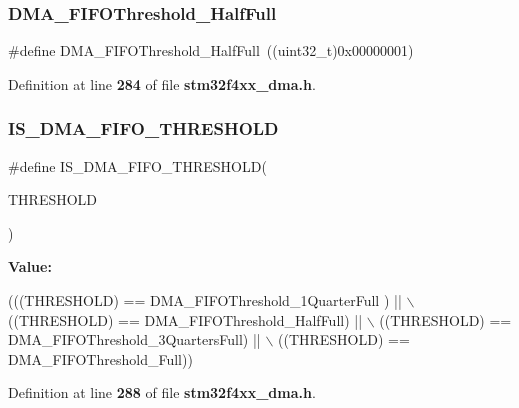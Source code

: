 \subsubsection{D\+M\+A\+\_\+\+F\+I\+F\+O\+Threshold\+\_\+\+Half\+Full}
{\footnotesize\ttfamily \#define D\+M\+A\+\_\+\+F\+I\+F\+O\+Threshold\+\_\+\+Half\+Full~((uint32\+\_\+t)0x00000001)}



Definition at line \textbf{ 284} of file \textbf{ stm32f4xx\+\_\+dma.\+h}.

\mbox{\label{group__DMA__fifo__threshold__level_gaeafc0d9e327d6e5b26cd37f6744b232f}} 
\subsubsection{I\+S\+\_\+\+D\+M\+A\+\_\+\+F\+I\+F\+O\+\_\+\+T\+H\+R\+E\+S\+H\+O\+LD}
{\footnotesize\ttfamily \#define I\+S\+\_\+\+D\+M\+A\+\_\+\+F\+I\+F\+O\+\_\+\+T\+H\+R\+E\+S\+H\+O\+LD(\begin{DoxyParamCaption}\item[{}]{T\+H\+R\+E\+S\+H\+O\+LD }\end{DoxyParamCaption})}

{\bfseries Value\+:}
\begin{DoxyCode}
(((THRESHOLD) == DMA_FIFOThreshold_1QuarterFull ) || \(\backslash\)
                                          ((THRESHOLD) == 
      DMA_FIFOThreshold_HalfFull)      || \(\backslash\)
                                          ((THRESHOLD) == 
      DMA_FIFOThreshold_3QuartersFull) || \(\backslash\)
                                          ((THRESHOLD) == DMA_FIFOThreshold_Full))
\end{DoxyCode}


Definition at line \textbf{ 288} of file \textbf{ stm32f4xx\+\_\+dma.\+h}.

